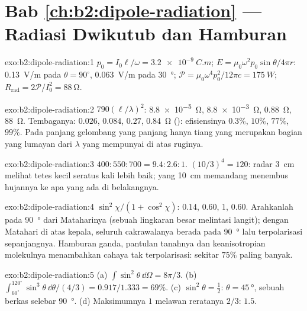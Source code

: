 \section*{Bab \ref{ch:b2:dipole-radiation} --- Radiasi Dwikutub dan Hamburan}

\begin{solution}{exo:b2:dipole-radiation:1}
$p_0 = I_0\ell/\omega = \qty{3.2e-9}{C.m}$; $E = \mu_0\omega^2p_0\sin\theta/4\pi r$: \qty{0.13}{V/m}
pada $\theta = 90^\circ$, \qty{0.063}{V/m} pada \qty{30}{\degree}; $\mathcal P = \mu_0\omega^4p_0^2/12\pi c =
\qty{175}{W}$; $R_{\text{rad}} = 2\mathcal P/I_0^2 = \qty{88}{\ohm}$.
\end{solution}

\begin{solution}{exo:b2:dipole-radiation:2}
$790(\ell/\lambda)^2$: \qty{8.8e-5}{\ohm}, \qty{8.8e-3}{\ohm}, \qty{0.88}{\ohm}, \qty{88}{\ohm}. Tembaganya:
$0.026$, $0.084$, $0.27$, \qty{0.84}{\ohm} (): efisiensinya $0.3\%$, $10\%$,
$77\%$, $99\%$. Pada panjang gelombang yang panjang hanya tiang yang merupakan bagian yang lumayan dari
$\lambda$ yang mempunyai  di atas ruginya.
\end{solution}

\begin{solution}{exo:b2:dipole-radiation:3}
$400 : 550 : 700 = 9.4 : 2.6 : 1$. $(10/3)^4 = 120$: radar \qty{3}{cm}
melihat tetes kecil seratus kali lebih baik; yang \qty{10}{cm} memandang
menembus hujannya ke apa yang ada di belakangnya.
\end{solution}

\begin{solution}{exo:b2:dipole-radiation:4}
$\sin^2\chi/(1 + \cos^2\chi)$: $0.14$, $0.60$, $1$, $0.60$. Arahkanlah pada \qty{90}{\degree} dari
Mataharinya (sebuah lingkaran besar melintasi langit); dengan Matahari di atas kepala, seluruh
cakrawalanya berada pada \qty{90}{\degree} lalu terpolarisasi sepanjangnya. Hamburan ganda,
pantulan tanahnya dan keanisotropian molekulnya menambahkan cahaya
tak terpolarisasi: sekitar $75\%$ paling banyak.
\end{solution}

\begin{solution}{exo:b2:dipole-radiation:5}
(a) $\int\sin^2\theta\,\dd\Omega = 8\pi/3$. (b) $\int_{60^\circ}^{120^\circ}\sin^3\theta\,\dd\theta/
(4/3) = 0.917/1.333 = 69\%$. (c) $\sin^2\theta = \tfrac12$: $\theta = \qty{45}{\degree}$, sebuah
berkas selebar \qty{90}{\degree}. (d) Maksimumnya $1$ melawan reratanya $2/3$: $1.5$.
\end{solution}

